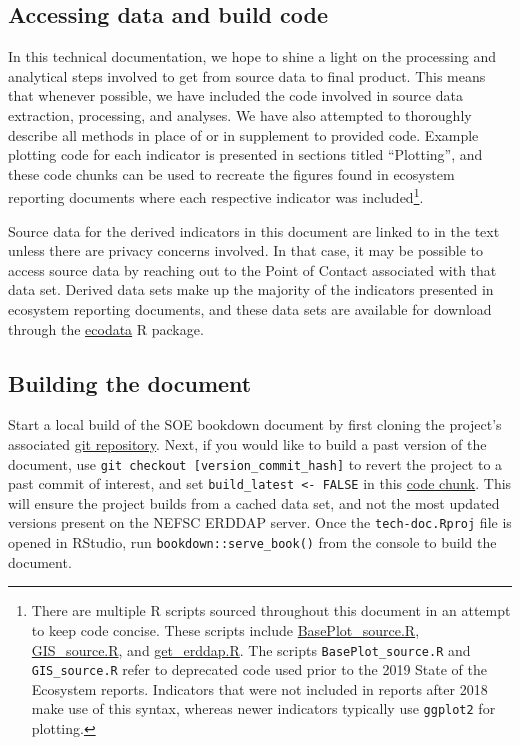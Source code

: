 \documentclass[
]{book}
\begin{document}
\hypertarget{accessing-data-and-build-code}{%
\subsection{Accessing data and build code}\label{accessing-data-and-build-code}}

In this technical documentation, we hope to shine a light on the processing and analytical steps involved to get from source data to final product. This means that whenever possible, we have included the code involved in source data extraction, processing, and analyses. We have also attempted to thoroughly describe all methods in place of or in supplement to provided code. Example plotting code for each indicator is presented in sections titled ``Plotting'', and these code chunks can be used to recreate the figures found in ecosystem reporting documents where each respective indicator was included\footnote{There are multiple R scripts sourced throughout this document in an attempt to keep code concise. These scripts include \href{https://github.com/NOAA-EDAB/tech-doc/blob/master/R/BasePlot_source.R}{BasePlot\_source.R}, \href{https://github.com/NOAA-EDAB/tech-doc/blob/master/R/GIS_source.R}{GIS\_source.R}, and \href{https://github.com/NOAA-EDAB/tech-doc/blob/master/R/get_erddap.R}{get\_erddap.R}. The scripts \texttt{BasePlot\_source.R} and \texttt{GIS\_source.R} refer to deprecated code used prior to the 2019 State of the Ecosystem reports. Indicators that were not included in reports after 2018 make use of this syntax, whereas newer indicators typically use \texttt{ggplot2} for plotting.}.

Source data for the derived indicators in this document are linked to in the text unless there are privacy concerns involved. In that case, it may be possible to access source data by reaching out to the Point of Contact associated with that data set. Derived data sets make up the majority of the indicators presented in ecosystem reporting documents, and these data sets are available for download through the \href{https://github.com/NOAA-EDAB/ecodata}{ecodata} R package.

\hypertarget{building-the-document}{%
\subsection{Building the document}\label{building-the-document}}

Start a local build of the SOE bookdown document by first cloning the project's associated \href{https://github.com/NOAA-EDAB/tech-doc}{git repository}. Next, if you would like to build a past version of the document, use \texttt{git\ checkout\ {[}version\_commit\_hash{]}} to revert the project to a past commit of interest, and set \texttt{build\_latest\ \textless{}-\ FALSE} in this \href{https://github.com/NOAA-EDAB/tech-doc/tree/master/R/stored_scripts/erddap_query_and_build_code.R}{code chunk}. This will ensure the project builds from a cached data set, and not the most updated versions present on the NEFSC ERDDAP server. Once the \texttt{tech-doc.Rproj} file is opened in RStudio, run \texttt{bookdown::serve\_book()} from the console to build the document.
\end{document}

